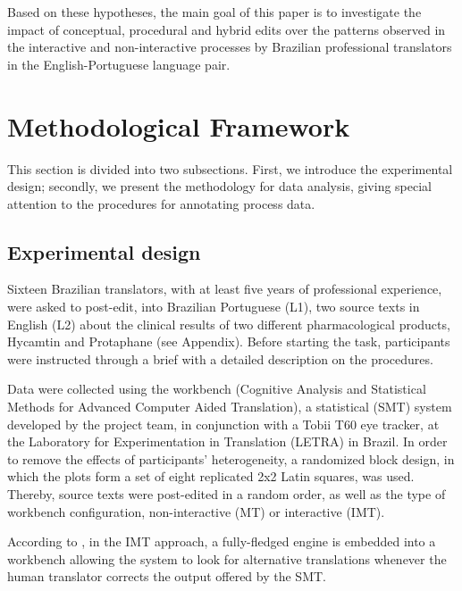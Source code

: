 \documentclass[output=paper]{langsci/langscibook}
\begin{document}
Based on these hypotheses, the main goal of this paper is to investigate the impact of conceptual, procedural and hybrid  edits over the  patterns observed in the interactive and non-interactive  processes by Brazilian professional translators in the English-Portuguese language pair.


\section{Methodological Framework\label{alves:sec:MethodologicalFramework}}

This section is divided into two subsections. First, we introduce the experimental design; secondly, we present the methodology for data analysis, giving special attention to the procedures for annotating  process data.   

\subsection{Experimental design\label{alves:sec:ExperimentalDesign}}

Sixteen Brazilian translators, with at least five years of professional experience, were asked to post-edit, into Brazilian Portuguese (L1), two source texts in English (L2) about the clinical results of two different pharmacological products, Hycamtin and Protaphane (see Appendix). Before starting the task, participants were instructed through a brief with a detailed description on the procedures.


Data were collected using the  workbench (Cognitive Analysis and Statistical Methods for Advanced Computer Aided Translation), a statistical  (SMT) system developed by the  project team, in conjunction with a Tobii T60 eye tracker, at the Laboratory for Experimentation in Translation (LETRA) in Brazil. In order to remove the effects of participants' heterogeneity, a randomized block design, in which the plots form a set of eight replicated 2x2 Latin squares, was used. Thereby, source texts were post-edited in a random order, as well as the type of workbench configuration, non-interactive  (MT) or interactive  (IMT).



According to \citet{Alabau2013}, in the IMT approach, a fully-fledged  engine is embedded into a  workbench allowing the system to look for alternative translations whenever the human translator corrects the output offered by the SMT. 
\end{document}
